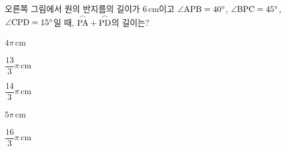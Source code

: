 \noindent\begin{minipage}[t]{0.58\linewidth}\vspace{0pt}\raggedright 오른쪽 그림에서 원의 반지름의 길이가 $6\,\mathrm{cm}$이고 $\angle\mathrm{APB}=40^\circ$, $\angle\mathrm{BPC}=45^\circ$, $\angle\mathrm{CPD}=15^\circ$일 때, $\overset{\frown}{\mathrm{PA}}+\overset{\frown}{\mathrm{PD}}$의 길이는?\end{minipage}\hfill\begin{minipage}[t]{0.4\linewidth}\vspace{0pt}\centering \resizebox{\ifdim\width>\linewidth\linewidth\else\width\fi}{!}{}\end{minipage}\par
\begin{choicesii}{\rule[-3ex]{0pt}{8ex}$4\pi\,\mathrm{cm}$}{\rule[-3ex]{0pt}{8ex}$\dfrac{13}{3}\pi\,\mathrm{cm}$}{\rule[-3ex]{0pt}{8ex}$\dfrac{14}{3}\pi\,\mathrm{cm}$}{\rule[-3ex]{0pt}{8ex}$5\pi\,\mathrm{cm}$}{\rule[-3ex]{0pt}{8ex}$\dfrac{16}{3}\pi\,\mathrm{cm}$}\end{choicesii}
